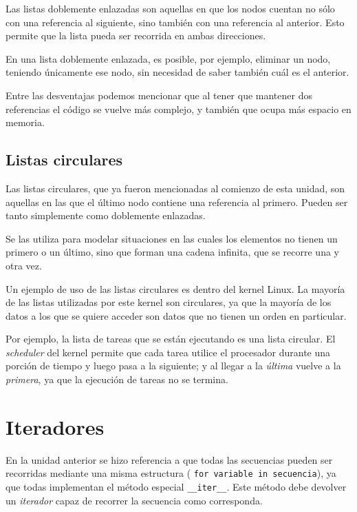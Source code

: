 Las listas doblemente enlazadas son aquellas en que los nodos cuentan no
sólo con una referencia al siguiente, sino también con una referencia al
anterior.  Esto permite que la lista pueda ser recorrida en ambas
direcciones.

En una lista doblemente enlazada, es posible, por ejemplo, eliminar un
nodo, teniendo únicamente ese nodo, sin necesidad de saber también cuál es
el anterior.

Entre las desventajas podemos mencionar que al tener que mantener dos
referencias el código se vuelve más complejo, y también que ocupa más
espacio en memoria.

\subsection*{Listas circulares}

Las listas circulares, que ya fueron mencionadas al comienzo de esta
unidad, son aquellas en las que el último nodo contiene una referencia al
primero.  Pueden ser tanto simplemente como doblemente enlazadas.

Se las utiliza para modelar situaciones en las cuales los elementos no
tienen un primero o un último, sino que forman una cadena infinita, que se
recorre una y otra vez.

\begin{sabias_que}
Un ejemplo de uso de las listas circulares es dentro del kernel Linux.  La
mayoría de las listas utilizadas por este kernel son circulares, ya que la
mayoría de los datos a los que se quiere acceder son datos que no tienen un
orden en particular.

Por ejemplo, la lista de tareas que se están ejecutando es una lista
circular.  El {\it scheduler} del kernel permite que cada tarea utilice el
procesador durante una porción de tiempo y luego pasa a la siguiente; y al
llegar a la {\it última} vuelve a la {\it primera}, ya que la ejecución de
tareas no se termina.
\end{sabias_que}

\section{Iteradores}

En la unidad anterior se hizo referencia a que todas las secuencias
pueden ser recorridas mediante una misma estructura (
\lstinline!for variable in secuencia!), ya que todas implementan el método
especial \lstinline!__iter__!.  Este método debe devolver un {\it iterador}
capaz de recorrer la secuencia como corresponda.

